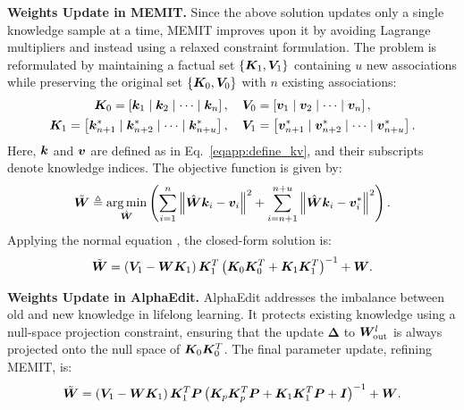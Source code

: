 \textbf{Weights Update in MEMIT.} Since the above solution updates only a single knowledge sample at a time, MEMIT improves upon it by avoiding Lagrange multipliers and instead using a relaxed constraint formulation. The problem is reformulated by maintaining a factual set $\{{\bm{K}}_1, {\bm{V}}_1\}$ containing $u$ new associations while preserving the original set $\{{\bm{K}}_0, {\bm{V}}_0\}$ with $n$ existing associations:
\begin{equation}
\begin{gathered}
    {\bm{K}}_0 = \left[{\bm{k}}_1 \mid {\bm{k}}_2 \mid \dots \mid {\bm{k}}_n\right], \quad {\bm{V}}_0 = \left[{\bm{v}}_1 \mid {\bm{v}}_2 \mid \dots \mid {\bm{v}}_n\right], \\
    {\bm{K}}_1 = \left[{\bm{k}}^\ast_{n+1} \mid {\bm{k}}^\ast_{n+2} \mid \dots \mid {\bm{k}}^\ast_{n+u}\right], \quad {\bm{V}}_1 = \left[{\bm{v}}^\ast_{n+1} \mid {\bm{v}}^\ast_{n+2} \mid \dots \mid {\bm{v}}^\ast_{n+u}\right].
\end{gathered}
\end{equation}
Here, ${\bm{k}}$ and ${\bm{v}}$ are defined as in Eq.~\ref{eqapp:define_kv}, and their subscripts denote knowledge indices. The objective function is given by:
\begin{equation}
    \tilde{{\bm{W}}} \triangleq \operatorname*{arg\,min}_{\hat{{\bm{W}}}} \left( \sum_{i=1}^{n} \left\| \hat{{\bm{W}}} {\bm{k}}_i - {\bm{v}}_i \right\|^2 + \sum_{i=n+1}^{n+u} \left\| \hat{{\bm{W}}} {\bm{k}}_i - {\bm{v}}^\ast_i \right\|^2 \right).
\end{equation}
Applying the normal equation \citep{normal_equation}, the closed-form solution is:
\begin{equation}
    \tilde{{\bm{W}}} = \left( {\bm{V}}_1 - {\bm{W}} {\bm{K}}_1 \right) {\bm{K}}_1^T \left( {\bm{K}}_0 {\bm{K}}_0^T + {\bm{K}}_1 {\bm{K}}_1^T \right)^{-1} + {\bm{W}}.
\end{equation}

\textbf{Weights Update in AlphaEdit.} AlphaEdit addresses the imbalance between old and new knowledge in lifelong learning. It protects existing knowledge using a null-space projection constraint, ensuring that the update $\bm{\Delta}$ to ${\bm{W}}_{\text{out}}^l$ is always projected onto the null space of ${\bm{K}}_0 {\bm{K}}_0^T$. The final parameter update, refining MEMIT, is:
\begin{equation}
    \tilde{{\bm{W}}} = \left( {\bm{V}}_1 - {\bm{W}} {\bm{K}}_1 \right) {\bm{K}}_1^T {\bm{P}} \left( {\bm{K}}_p {\bm{K}}_p^T {\bm{P}} + {\bm{K}}_1 {\bm{K}}_1^T {\bm{P}} + {\bm{I}} \right)^{-1}+ {\bm{W}}.
\end{equation}


